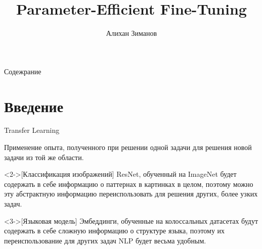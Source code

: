 \documentclass[9pt]{beamer}
\title[\textbf{PEFT}]{Parameter-Efficient Fine-Tuning} %
\author[\textbf{Алихан Зиманов}]
{Алихан Зиманов} %
\institute[\textbf{ПМИ ФКН НИУ ВШЭ}] %
{Факультет компьютерных наук\\
НИУ ВШЭ %
}
\begin{document}
{
\beamertemplatenavigationsymbolsempty
\begin{frame}[plain]
\titlepage
\end{frame}
}

{
\beamertemplatenavigationsymbolsempty
{}
{ }
\begin{frame}{Содежрание} 
\tableofcontents 
\end{frame} 
}

\addtocounter{framenumber}{-2}


\section{Введение}


\begin{frame}{Transfer Learning}

    \begin{definition}
        Применение опыта, полученного при решении одной задачи для решения новой задачи из той же области.
    \end{definition}

    \begin{example}<2->[Классификация изображений]
        ResNet, обученный на ImageNet будет содержать в себе информацию о паттернах в картинках в целом, поэтому можно эту абстрактную информацию переиспользовать для решения других, более узких задач.
    \end{example}

    \begin{example}<3->[Языковая модель]
        Эмбеддинги, обученные на колоссальных датасетах будут содержать в себе сложную информацию о структуре языка, поэтому их переиспользование для других задач NLP будет весьма удобным.
    \end{example}

\end{frame}
\end{document}

